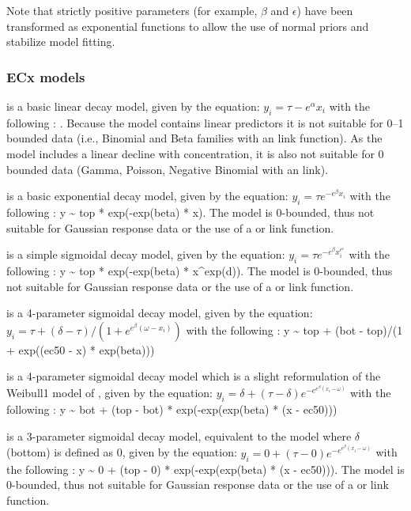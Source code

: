 \documentclass[
  shortnames]{jss}
\begin{document}
Note that strictly positive parameters (for example, \(\beta\) and \(\epsilon\)) have been transformed as exponential functions to allow the use of normal priors and stabilize model fitting.

\subsubsection[ECx models]{ECx models}\label{ecx-models}

 is a basic linear decay model, given by the equation:
\(y_i = \tau - e^{\alpha} x_i\)
with the following : . Because the model contains linear predictors it is not suitable for 0--1 bounded data (i.e., Binomial and Beta families with an  link function). As the model includes a linear decline with concentration, it is also not suitable for 0 bounded data (Gamma, Poisson, Negative Binomial with an  link).

 is a basic exponential decay model, given by the equation: \(y_i = \tau e^{-e^{\beta} x_i}\)
with the following : y \textasciitilde{} top * exp(-exp(beta) * x). The model is 0-bounded, thus not suitable for Gaussian response data or the use of a  or  link function.

 is a simple sigmoidal decay model, given by the equation:
\(y_i = \tau e^{-e^{\beta} x_i^{e^\epsilon}}\)
with the following : y \textasciitilde{} top * exp(-exp(beta) * x\^{}exp(d)). The model is 0-bounded, thus not suitable for Gaussian response data or the use of a  or  link function.

 is a 4-parameter sigmoidal decay model, given by the equation:
\(y_i = \tau + (\delta - \tau)/(1 + e^{e^{\beta} (\omega - x_i)})\)
with the following : y \textasciitilde{} top + (bot - top)/(1 + exp((ec50 - x) * exp(beta)))

 is a 4-parameter sigmoidal decay model which is a slight reformulation of the Weibull1 model of \citet{Ritz2016}, given by the equation:
\(y_i = \delta + (\tau - \delta) e^{-e^{e^{\beta} (x_i - \omega)}}\)
with the following : y \textasciitilde{} bot + (top - bot) * exp(-exp(exp(beta) * (x - ec50)))

 is a 3-parameter sigmoidal decay model, equivalent to the  model where \(\delta\) (bottom) is defined as 0, given by the equation:
\(y_i = {0} + (\tau - {0}) e^{-e^{e^{\beta} (x_i - \omega)}}\)
with the following : y \textasciitilde{} 0 + (top - 0) * exp(-exp(exp(beta) * (x - ec50))). The model is 0-bounded, thus not suitable for Gaussian response data or the use of a  or  link function.
\end{document}
